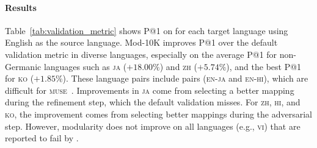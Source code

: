 \paragraph{Results}
Table~\ref{tab:validation_metric} shows P@1 on  for each target
language using English as the source language.
Mod-10K improves P@1 over the default validation metric in diverse
languages, especially on the average P@1 for non-Germanic languages
such as \textsc{ja} ($+18.00\%$) and \textsc{zh} ($+5.74\%$), and the
best P@1 for \textsc{ko} ($+1.85\%$).
These language pairs include pairs (\textsc{en-ja} and
\textsc{en-hi}), which are difficult for \textsc{muse}~\cite{non_adv}.
Improvements in \textsc{ja} come from selecting a better mapping
 during the refinement step, which the default validation
misses.  For \textsc{zh}, \textsc{hi}, and
\textsc{ko}, the improvement comes from selecting better mappings
during the adversarial step.
However, modularity does not improve
on all languages (e.g., \textsc{vi}) that are reported to fail by \citet{non_adv}.

